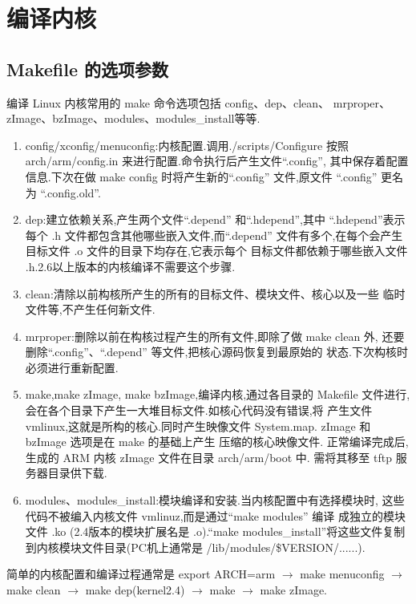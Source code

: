 \section{编译内核}
\subsection{Makefile 的选项参数}
	编译 Linux 内核常用的 make 命令选项包括 config、dep、clean、
mrproper、zImage、bzImage、modules、modules\_install等等.
\begin{enumerate}\itemsep=-3pt
  \item config/xconfig/menuconfig:内核配置.调用./scripts/Configure 按照
		arch/arm/config.in 来进行配置.命令执行后产生文件``.config'',
		其中保存着配置信息.下次在做 make config 时将产生新的``.config''
		文件,原文件 ``.config'' 更名为 ``.config.old''.
  \item dep:建立依赖关系,产生两个文件``.depend'' 和``.hdepend'',其中
		``.hdepend''表示每个 .h 文件都包含其他哪些嵌入文件,而``.depend''
		文件有多个,在每个会产生目标文件 .o 文件的目录下均存在,它表示每个
		目标文件都依赖于哪些嵌入文件 .h.2.6以上版本的内核编译不需要这个步骤.
  \item clean:清除以前构核所产生的所有的目标文件、模块文件、核心以及一些
		临时文件等,不产生任何新文件.
  \item mrproper:删除以前在构核过程产生的所有文件,即除了做 make clean 外,
		还要删除``.config''、``.depend'' 等文件,把核心源码恢复到最原始的
		状态.下次构核时必须进行重新配置.
  \item make,make zImage, make bzImage,编译内核,通过各目录的 Makefile
		文件进行,会在各个目录下产生一大堆目标文件.如核心代码没有错误,将
		产生文件 vmlinux,这就是所构的核心.同时产生映像文件 System.map.
		zImage 和 bzImage 选项是在 make 的基础上产生 压缩的核心映像文件.
		正常编译完成后, 生成的 ARM 内核 zImage 文件在目录 arch/arm/boot 中.
		需将其移至 tftp 服务器目录供下载.
  \item modules、modules\_install:模块编译和安装.当内核配置中有选择模块时,
		这些代码不被编入内核文件 vmlinuz,而是通过``make modules'' 编译
		成独立的模块文件 .ko (2.4版本的模块扩展名是 .o).``make
		modules\_install''将这些文件复制到内核模块文件目录(PC机上通常是
		/lib/modules/\$VERSION/......).
\end{enumerate}

	简单的内核配置和编译过程通常是 export ARCH=arm $\to$ make menuconfig
	$\to$ make clean $\to$ make dep(kernel2.4) $\to$ make $\to$
	make zImage.

